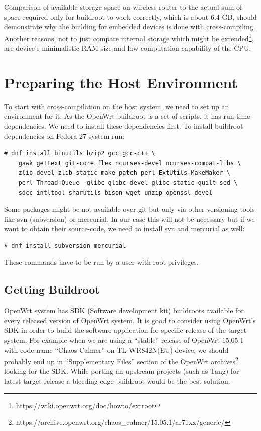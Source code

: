Comparison of available storage space on wireless router to the actual sum of space required only for buildroot to work correctly, which is about 6.4 GB, should demonstrate why the building for embedded devices is done with cross-compiling.
Another reasons, not to just compare internal storage which might be extended\footnote{https://wiki.openwrt.org/doc/howto/extroot}, are device's minimalistic RAM size and low computation capability of the CPU.



\section{Preparing the Host Environment}

To start with cross-compilation on the host system, we need to set up an environment for it.
As the OpenWrt buildroot is a set of scripts, it has run-time dependencies.
We need to install these dependencies first.
To install buildroot dependencies on Fedora 27 system run:
\begin{lstlisting}[columns=fixed,basicstyle=\ttfamily\footnotesize,tabsize=4,backgroundcolor=\color{yellow!10}]
# dnf install binutils bzip2 gcc gcc-c++ \
    gawk gettext git-core flex ncurses-devel ncurses-compat-libs \
    zlib-devel zlib-static make patch perl-ExtUtils-MakeMaker \
    perl-Thread-Queue  glibc glibc-devel glibc-static quilt sed \
    sdcc intltool sharutils bison wget unzip openssl-devel
\end{lstlisting}
Some packages might be not available over git but only via other versioning tools like svn (subversion) or mercurial.
In our case this will not be necessary but if we want to obtain their source-code, we need to install svn and mercurial as well:
\begin{lstlisting}[columns=fixed,basicstyle=\ttfamily\footnotesize,tabsize=4,backgroundcolor=\color{yellow!10}]
# dnf install subversion mercurial
\end{lstlisting}
These commands have to be run by a user with root privileges.



\subsection{Getting Buildroot}

OpenWrt system has SDK (Software development kit) buildroots available for every released version of OpenWrt system.
It is good to consider using OpenWrt's SDK in order to build the software application for specific release of the target system.
For example when we are using a “stable” release of OpenWrt 15.05.1 with code-name “Chaos Calmer” on TL-WR842N(EU) device, we should probably end up in “Supplementary Files” section of the OpenWrt archives\footnote{https://archive.openwrt.org/chaos\_calmer/15.05.1/ar71xx/generic/} looking for the SDK.
While porting an upstream projects (such as Tang) for latest target release a bleeding edge buildroot would be the best solution.

